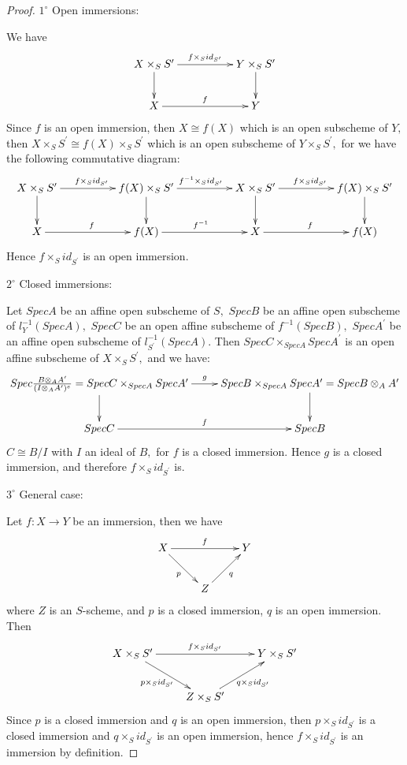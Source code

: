 \begin{proof}
$\mathit{1^{\circ}}$ Open immersions:

We have
\[ \xymatrix@C=5em{
   {X\times_S S^{\prime}} \ar[d] \ar[r]^{f\times_S id_{S^{\prime}}} &
   {Y\times_S S^{\prime}} \ar[d]                                    \\
   X \ar[r]^f &Y } \]
Since $f$ is an open immersion, then $X\cong f(X)$ which is an open
subscheme of $Y,$ then $X\times_S S^{\prime}\cong f(X)\times_S
S^{\prime}$ which is an open subscheme of $Y\times_S S^{\prime},$
for we have the following commutative diagram:
\[ \xymatrix@C=5em{
   {X\times_S S^{\prime}} \ar[d] \ar[r]^{f\times_S id_{S^{\prime}}} &
   {f(X)\times_S S^{\prime}} \ar[d] \ar[r]^{f^{-1}\times_S id_{S^{\prime}}}
   & {X\times_S S^{\prime}} \ar[d] \ar[r]^{f\times_S id_{S^{\prime}}} &
   {f(X)\times_S S^{\prime}} \ar[d]                                \\
   X \ar[r]^f &f(X) \ar[r]^{f^{-1}} &X \ar[r]^f & f(X) } \]
Hence $f\times_S id_{S^{\prime}}$ is an open immersion.

$\mathit{2^{\circ}}$ Closed immersions:

Let $SpecA$ be an affine open subscheme of $S,$ $SpecB$ be an affine
open subscheme of $l^{-1}_Y(SpecA),$ $SpecC$ be an open affine
subscheme of $f^{-1}(SpecB),$ $SpecA^{\prime}$ be an affine open
subscheme of $l^{-1}_{S^{\prime}}(SpecA).$ Then $SpecC\times_{SpecA}
SpecA^{\prime}$ is an open affine subscheme of $X\times_S
S^{\prime},$ and we have:
\[ \xymatrix{
   {Spec\frac{B\otimes_A A^{\prime}}{(I\otimes_A A^{\prime})^e}=SpecC\times_{SpecA}
   SpecA^{\prime}} \ar[d] \ar[r]^g &
   {SpecB\times_{SpecA} SpecA^{\prime}=SpecB\otimes_A A^{\prime}} \ar[d]\\
   SpecC \ar[r]^f & SpecB } \]
$C\cong B/I$ with $I$ an ideal of $B,$ for $f$ is a closed
immersion. Hence $g$ is a closed immersion, and therefore $f\times_S
id_{S^{\prime}}$ is.

$\mathit{3^{\circ}}$ General case:

Let $f:X\rightarrow Y$ be an immersion, then we have
\[ \xymatrix{
   X \ar"1,3"^f \ar"2,2"_p & & Y\\
   & Z \ar"1,3"_q} \]
where $Z$ is an $S$-scheme, and $p$ is a closed immersion, $q$ is an
open immersion. Then
\[ \xymatrix{
   {X\times_S S^{\prime}} \ar"1,3"^{f\times_S id_{S^{\prime}}} \ar"2,2"_{p\times_S id_{S^{\prime}}}
   & & {Y\times_S S^{\prime}}\\
   & {Z\times_S S^{\prime}} \ar"1,3"_{q\times_S id_{S^{\prime}}}} \]
Since $p$ is a closed immersion and $q$ is an open immersion, then
$p\times_S id_{S^{\prime}}$ is a closed immersion and $q\times_S
id_{S^{\prime}}$ is an open immersion, hence $f\times_S
id_{S^{\prime}}$ is an immersion by definition.
\end{proof}
